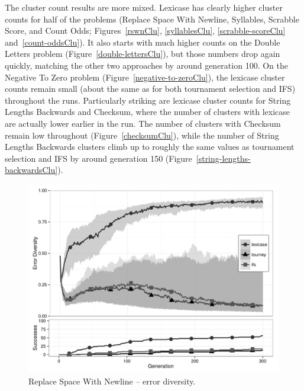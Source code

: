 The cluster count results are more mixed. Lexicase has clearly higher cluster counts for
half of the problems (Replace Space With Newline, Syllables, Scrabble Score, and Count Odds;
Figures~\ref{rswnClu}, \ref{syllablesClu}, \ref{scrabble-scoreClu} and~\ref{count-oddsClu}).
It also starts with much higher counts on the Double Letters problem (Figure~\ref{double-lettersClu}), 
but those numbers drop again quickly, matching the other two approaches by around generation 100. 
On the Negative To Zero problem (Figure~\ref{negative-to-zeroClu}), the lexicase
cluster counts remain small (about the same as for both tournament selection and IFS) throughout the runs.
Particularly striking are lexicase cluster counts for String Lengths Backwards and Checksum, where the
number of clusters with lexicase are actually lower earlier in the run. The number of clusters with
Checksum remain low throughout (Figure~\ref{checksumClu}), while the number of String Lengths Backwards 
clusters climb up to roughly the same values as tournament selection and IFS by around generation 150 
(Figure~\ref{string-lengths-backwardsClu}).

\begin{figure}[p] %
\centering
\includegraphics[width=11.5cm]{replace-space-with-newline-diversity.pdf}
\caption{Replace Space With Newline -- error diversity.}
\label{rswnDiv}
\end{figure}

